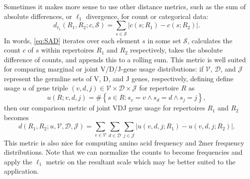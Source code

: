 \documentclass{article}
\begin{document}
Sometimes it makes more sense to use other distance metrics, such as the sum of absolute differences, or $\ell_1$ divergence, for count or categorical data:
\begin{equation}\label{eq:SAD}
    d_{\ell_1}(R_1, R_2; c, \mathcal S) = \sum_{s \in \mathcal S} \left| c(s; R_1) - c(s; R_2) \right|.
\end{equation}
In words, \eqref{eq:SAD} iterates over each element $s$ in some set $\mathcal S$, calculates the count $c$ of $s$ within repertoires $R_1$ and $R_2$ respectively, takes the absolute difference of counts, and appends this to a rolling sum.
This metric is well suited for comparing marginal or joint V/D/J-gene usage distributions:
if $\mathcal V$, $\mathcal D$, and $\mathcal J$ represent the germline sets of V, D, and J genes, respectively,
defining define usage $u$ of gene triple $(v, d, j) \in \mathcal V \times \mathcal D \times \mathcal J$ for repertoire $R$ as
\begin{equation}
u(R; v, d, j) = \#\left\{s \in R: s_v = v \land s_d = d \land s_j = j\right\},
\end{equation}
then our comparison metric of joint VDJ gene usage for repertoires $R_1$ and $R_2$ becomes
\begin{equation}
d(R_1, R_2; u, \mathcal V, \mathcal D, \mathcal J) = \sum_{v \in \mathcal V} \sum_{d \in \mathcal D} \sum_{j \in \mathcal J} \left| u(v, d, j; R_1) - u(v, d, j; R_2) \right|.
\end{equation}
This metric is also nice for computing amino acid frequency and 2mer frequency distributions.
Note that we can normalize the counts to become frequencies and apply the $\ell_1$ metric on the resultant scale which may be better suited to the application.
\end{document}

